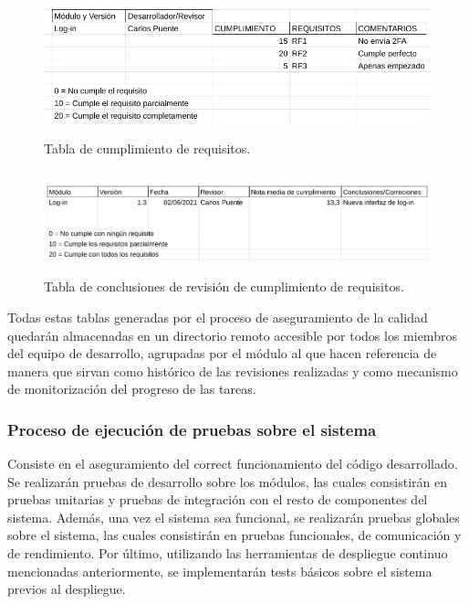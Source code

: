 \documentclass{article}
\begin{document}
\begin{figure}[H]
   \centering
       \includegraphics[height=4cm]{../images/tabla_cumplimiento_requisitos.png}
   \caption{Tabla de cumplimiento de requisitos.}
   \label{tablaRequisitos}
\end{figure}

\begin{figure}[H]
   \centering
       \includegraphics[height=3cm]{../images/tabla_conclusiones_revision_requisitos.png}
   \caption{Tabla de conclusiones de revisión de cumplimiento de requisitos.}
   \label{tablaConclusionesRequisitos}
\end{figure}

Todas estas tablas generadas por el proceso de aseguramiento de la calidad quedarán almacenadas en un directorio remoto accesible por todos los miembros del equipo de desarrollo, agrupadas por el módulo al que hacen referencia de manera que sirvan como histórico de las revisiones realizadas y como mecanismo de monitorización del progreso de las tareas.

\subsubsection{Proceso de ejecución de pruebas sobre el sistema} \label{P.EC.14}

Consiste en el aseguramiento del correct funcionamiento del código desarrollado. Se realizarán pruebas de desarrollo sobre los módulos, las cuales consistirán en pruebas unitarias y pruebas de integración con el resto de componentes del sistema. Además, una vez el sistema sea funcional, se realizarán pruebas globales sobre el sistema, las cuales consistirán en pruebas funcionales, de comunicación y de rendimiento. Por último, utilizando las herramientas de despliegue continuo mencionadas anteriormente, se implementarán tests básicos sobre el sistema previos al despliegue.
\end{document}
